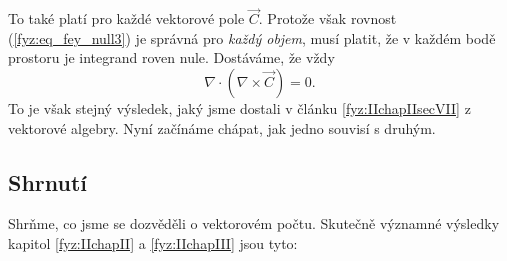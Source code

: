       To také platí pro každé vektorové pole \(\vec{C}\). Protože však rovnost 
      (\ref{fyz:eq_fey_null3}) je správná pro \emph{každý objem}, musí platit, že v každém bodě 
      prostoru je integrand roven nule. Dostáváme, že vždy
      \begin{equation}\label{fyz:eq_fey_null4}
        \nabla\cdot(\nabla\times\vec{C})=0.
      \end{equation}
      To je však stejný výsledek, jaký jsme dostali v článku \ref{fyz:IIchapIIsecVII} z vektorové 
      algebry. Nyní začínáme chápat, jak jedno souvisí s druhým.      
    
    \subsection{Shrnutí}
      Shrňme, co jsme se dozvěděli o vektorovém počtu. Skutečně významné výsledky kapitol
      \ref{fyz:IIchapII} a \ref{fyz:IIchapIII} jsou tyto:
